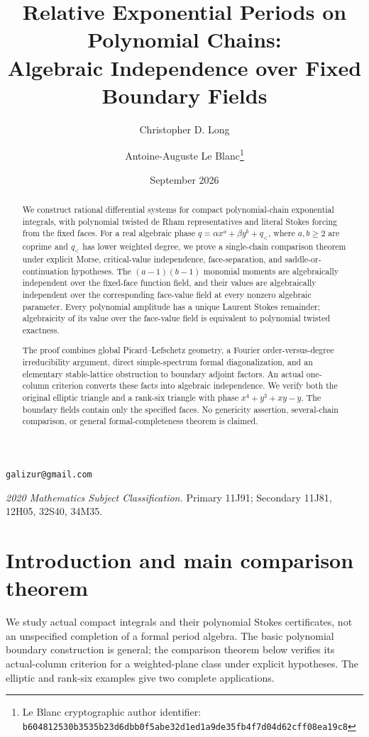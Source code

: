 \documentclass[11pt]{article}
\title{Relative Exponential Periods on Polynomial Chains:\\
Algebraic Independence over Fixed Boundary Fields}
\author{Christopher D. Long \and Antoine-Auguste Le Blanc\thanks{Le Blanc cryptographic author identifier: \texttt{b6048125\allowbreak{}30b3535b\allowbreak{}23d6dbb0\allowbreak{}f5abe32d\allowbreak{}1ed1a9de\allowbreak{}35fb4f7d\allowbreak{}04d62cff\allowbreak{}08ea19c8}}}
\date{September 2026}
\numberwithin{equation}{section}
\theoremstyle{definition}
\theoremstyle{remark}
\begin{document}
\maketitle

\begin{center}
\small
\texttt{galizur@gmail.com}
\end{center}

\begin{abstract}
We construct rational differential systems for compact polynomial-chain
exponential integrals, with polynomial twisted de Rham representatives and
literal Stokes forcing from the fixed faces. For a real algebraic phase
$q=\alpha x^a+\beta y^b+q_<$, where $a,b\ge2$ are coprime and $q_<$ has lower
weighted degree, we prove a single-chain comparison theorem under explicit
Morse, critical-value independence, face-separation, and saddle-or-continuation
hypotheses. The $(a-1)(b-1)$ monomial moments are algebraically independent
over the fixed-face function field, and their values are algebraically
independent over the corresponding face-value field at every nonzero
algebraic parameter. Every polynomial amplitude has a unique Laurent Stokes
remainder; algebraicity of its value over the face-value field is equivalent
to polynomial twisted exactness.

The proof combines global Picard--Lefschetz geometry, a Fourier
order-versus-degree irreducibility argument, direct simple-spectrum formal
diagonalization, and an elementary stable-lattice obstruction to boundary
adjoint factors. An actual one-column criterion converts these facts into
algebraic independence. We verify both the original elliptic triangle and a
rank-six triangle with phase $x^4+y^3+xy-y$. The boundary fields contain only
the specified faces. No genericity assertion, several-chain comparison,
or general formal-completeness theorem is claimed.
\end{abstract}

\medskip
\noindent\textit{2020 Mathematics Subject Classification.}
Primary 11J91; Secondary 11J81, 12H05, 32S40, 34M35.
\tableofcontents

\section{Introduction and main comparison theorem}\label{sec:intro}
We study actual compact integrals and their polynomial Stokes certificates,
not an unspecified completion of a formal period algebra. The basic
polynomial boundary construction is general; the comparison theorem below
verifies its actual-column criterion for a weighted-plane class under
explicit hypotheses. The elliptic and rank-six examples give two complete
applications.
\end{document}
